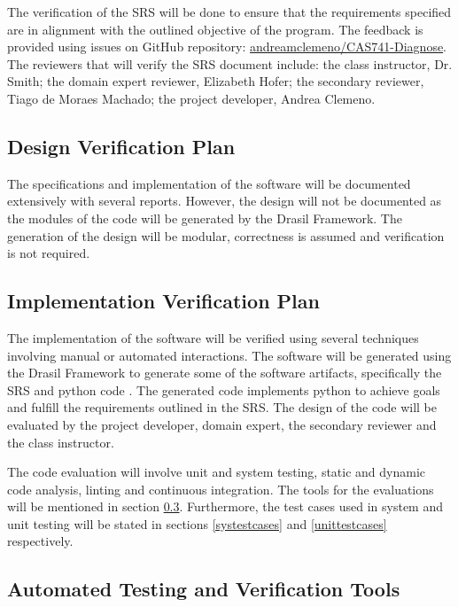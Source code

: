 \documentclass[12pt, titlepage]{article}
\begin{document}
The verification of the SRS will be done to ensure that the requirements 
specified are in alignment with the outlined objective of the \progname{} 
program. The feedback 
is provided using issues on GitHub repository: \href{https://github.com/andreamclemeno/CAS741-Diagnose/tree/master/test}{andreamclemeno/CAS741-Diagnose}. The 
reviewers that will verify the SRS document include: the class instructor, Dr. 
Smith;  the domain expert reviewer, Elizabeth Hofer; the secondary reviewer, 
Tiago de Moraes Machado; the project developer, Andrea Clemeno.

\subsection{Design Verification Plan}

The specifications and implementation of the software will be documented 
extensively with several reports. 
However, the design will not be documented as the modules of the code will be 
generated by the Drasil Framework. The generation of the design will be modular, 
correctness is assumed and verification is not required.

\subsection{Implementation Verification Plan}

The implementation of the software will be verified using several techniques 
involving manual or automated interactions. The software will be generated using 
the Drasil Framework to generate some of the software artifacts, specifically 
the SRS and python code \citep{Drasil}. The generated code implements python to 
achieve goals and fulfill the requirements outlined in the SRS. The 
design of the code will be evaluated by the project developer, domain expert, 
the secondary reviewer and the class instructor. 

The code evaluation will involve unit and system testing, static and dynamic 
code analysis, linting and continuous integration. The tools for the evaluations 
will be mentioned in section \ref{tools}. Furthermore, the test cases used in 
system and unit testing will be stated in sections \ref{systestcases} and 
\ref{unittestcases} respectively. 


\subsection{Automated Testing and Verification Tools}\label{tools}
\end{document}
